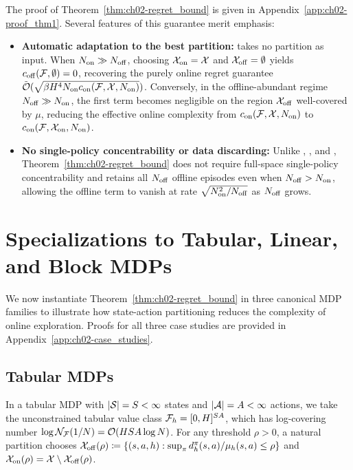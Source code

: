The proof of Theorem~\ref{thm:ch02-regret_bound} is given in Appendix~\ref{app:ch02-proof_thm1}. Several features of this guarantee merit emphasis:
\begin{itemize}
    \item \textbf{Automatic adaptation to the best partition:}  takes no partition as input. When $N_{{\operatorname{on}}} \gg N_{{\operatorname{off}}}$, choosing ${\mathcal{X}}_{{\operatorname{on}}} = {\mathcal{X}}$ and ${\mathcal{X}}_{{\operatorname{off}}} = \emptyset$ yields $c_{{\operatorname{off}}}({\mathcal{F}}, \emptyset) = 0$, recovering the purely online regret guarantee $\tilde{{\mathcal{O}}}(\sqrt{\beta H^4 N_{{\operatorname{on}}} c_{{\operatorname{on}}}({\mathcal{F}}, {\mathcal{X}}, N_{{\operatorname{on}}})})$. Conversely, in the offline-abundant regime $N_{{\operatorname{off}}} \gg N_{{\operatorname{on}}}$, the first term becomes negligible on the region ${\mathcal{X}}_{{\operatorname{off}}}$ well-covered by $\mu$, reducing the effective online complexity from $c_{{\operatorname{on}}}({\mathcal{F}}, {\mathcal{X}}, N_{{\operatorname{on}}})$ to $c_{{\operatorname{on}}}({\mathcal{F}}, {\mathcal{X}}_{{\operatorname{on}}}, N_{{\operatorname{on}}})$.
    \item \textbf{No single-policy concentrability or data discarding:} Unlike \citet{song2023hybrid}, \citet{nakamoto2023calql}, and \citet{amortila2024harnessing}, Theorem~\ref{thm:ch02-regret_bound} does not require full-space single-policy concentrability and retains all $N_{{\operatorname{off}}}$ offline episodes even when $N_{{\operatorname{off}}} > N_{{\operatorname{on}}}$, allowing the offline term to vanish at rate $\sqrt{N_{{\operatorname{on}}}^2 / N_{{\operatorname{off}}}}$ as $N_{{\operatorname{off}}}$ grows.
\end{itemize}

\section{Specializations to Tabular, Linear, and Block MDPs}
\label{sec:ch02-gfa-cases}

We now instantiate Theorem~\ref{thm:ch02-regret_bound} in three canonical MDP families to illustrate how state-action partitioning reduces the complexity of online exploration. Proofs for all three case studies are provided in Appendix~\ref{app:ch02-case_studies}.

\subsection{Tabular MDPs}
In a tabular MDP with $|{\mathcal{S}}| = S < \infty$ states and $|{\mathcal{A}}| = A < \infty$ actions, we take the unconstrained tabular value class ${\mathcal{F}}_h = [0, H]^{S A}$, which has log-covering number $\log {\mathcal{N}}_{{\mathcal{F}}}(1/N) = {\mathcal{O}}(H S A \log N)$. For any threshold $\rho > 0$, a natural partition chooses ${\mathcal{X}}_{{\operatorname{off}}}(\rho) \coloneqq \{(s, a, h) : \sup_{\pi} d^\pi_h(s, a)/\mu_h(s, a) \leq \rho\}$ and ${\mathcal{X}}_{{\operatorname{on}}}(\rho) = {\mathcal{X}} \setminus {\mathcal{X}}_{{\operatorname{off}}}(\rho)$.

